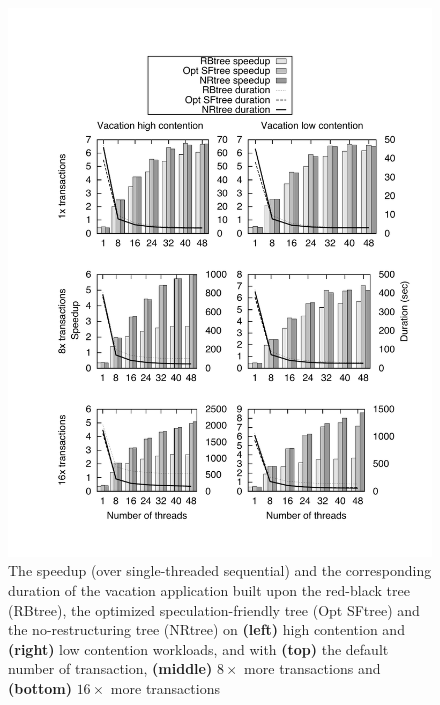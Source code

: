 \begin{figure}[t]	
	\begin{center}
	\includegraphics[scale=0.6,clip=true,viewport=49 5 580 750]{Tree/fig/vacation/vacation_avg2}
	\caption{The speedup (over single-threaded sequential) and the corresponding duration of the vacation application built upon the red-black tree (RBtree), the optimized speculation-friendly tree (Opt SFtree) and the no-restructuring tree (NRtree) on  {\bf (left)} high contention and  {\bf (right)} low contention workloads, and with  {\bf (top)} the default number of transaction,  {\bf (middle)} $8\times$ more transactions and {\bf (bottom)} $16\times$ more transactions\label{fig:vacation-threads}}	
	\end{center}
\end{figure}


